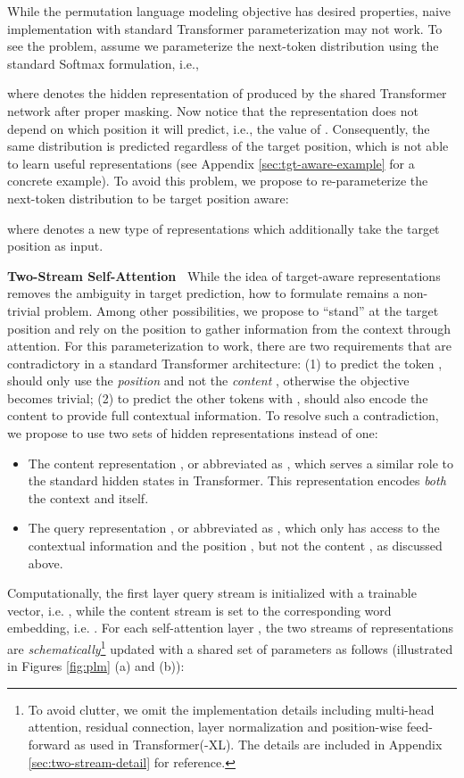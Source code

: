 \documentclass{article}
\begin{document}
\label{sec:tgt-aware}
While the permutation language modeling objective has desired properties, naive implementation with standard Transformer parameterization may not work.
To see the problem, assume we parameterize the next-token distribution  using the standard Softmax formulation, i.e.,

where  denotes the hidden representation of  produced by the shared Transformer network after proper masking.
Now notice that the representation  does not depend on which position it will predict, i.e., the value of .
Consequently, the same distribution is predicted regardless of the target position,
which is not able to learn useful representations (see Appendix \ref{sec:tgt-aware-example} for a concrete example).
To avoid this problem, we propose to re-parameterize the next-token distribution to be target position aware:

where  denotes a new type of representations which additionally take the target position  as input. 


\textbf{Two-Stream Self-Attention~}
While the idea of target-aware representations removes the ambiguity in target prediction, how to formulate  remains a non-trivial problem.
Among other possibilities, we propose to ``stand'' at the target position  and rely on the position  to gather information from the context  through attention.
For this parameterization to work, there are two requirements that are contradictory in a standard Transformer architecture: (1) to predict the token ,  should only use the \textit{position}  and not the \textit{content} , otherwise the objective becomes trivial; (2) to predict the other tokens  with ,  should also encode the content  to provide full contextual information.
To resolve such a contradiction, we propose to use two sets of hidden representations instead of one:
\begin{itemize}[leftmargin=*,topsep=0em,itemsep=0em]
\item The content representation , or abbreviated as , which serves a similar role to the standard hidden states in Transformer. This representation encodes \textit{both} the context and  itself.
\item The query representation , or abbreviated as , which only has access to the contextual information  and the position , but not the content , as discussed above.
\end{itemize}
Computationally, the first layer query stream is initialized with a trainable vector, i.e. , while the content stream is set to the corresponding word embedding, i.e. .
For each self-attention layer , the two streams of representations are \textit{schematically}\footnote{To avoid clutter, we omit the implementation details including multi-head attention, residual connection, layer normalization and position-wise feed-forward as used in Transformer(-XL). The details are included in Appendix \ref{sec:two-stream-detail} for reference.} updated with a shared set of parameters as follows (illustrated in Figures \ref{fig:plm} (a) and (b)):
\end{document}
